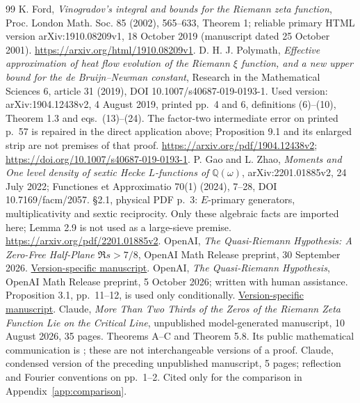 \documentclass[11pt]{article}
\theoremstyle{remark}\newtheorem{remark}[theorem]{Remark}
\begin{document}
\begin{thebibliography}{99}
 K. Ford, \emph{Vinogradov's integral and bounds for
the Riemann zeta function}, Proc. London Math. Soc. 85 (2002), 565--633,
Theorem 1; reliable primary HTML version arXiv:1910.08209v1,
18 October 2019 (manuscript dated 25 October 2001).
\url{https://arxiv.org/html/1910.08209v1}.
 D. H. J. Polymath,
\emph{Effective approximation of heat flow evolution of the Riemann
$\xi$ function, and a new upper bound for the de Bruijn--Newman constant},
Research in the Mathematical Sciences 6, article 31 (2019),
DOI 10.1007/s40687-019-0193-1.
Used version: arXiv:1904.12438v2, 4 August 2019, printed pp.~4 and 6,
definitions (6)--(10), Theorem 1.3 and eqs.~(13)--(24).
The factor-two intermediate error on printed p.~57 is repaired in
the direct application above; Proposition 9.1 and its enlarged strip
are not premises of that proof.
\url{https://arxiv.org/pdf/1904.12438v2};
\url{https://doi.org/10.1007/s40687-019-0193-1}.
 P. Gao and L. Zhao,
\emph{Moments and One level density of sextic Hecke $L$-functions
of $\mathbb Q(\omega)$}, arXiv:2201.01885v2, 24 July 2022;
Functiones et Approximatio 70(1) (2024), 7--28,
DOI 10.7169/facm/2057.
\S2.1, physical PDF p.~3: $E$-primary generators,
multiplicativity and sextic reciprocity.
Only these algebraic facts are imported here;
Lemma 2.9 is not used as a large-sieve premise.
\url{https://arxiv.org/pdf/2201.01885v2}.
 OpenAI,
\emph{The Quasi-Riemann Hypothesis: A Zero-Free Half-Plane
\(\Re s>7/8\)}, OpenAI Math Release preprint, 30 September 2026.
\href{https://github.com/openai/math/blob/fd4aeeb2ee4fc729c18d98444fed42fd0529eeeb/preprints/The-Quasi-Riemann-Hypothesis-September-30-2026/paper.pdf}{Version-specific manuscript}.
 OpenAI,
\emph{The Quasi-Riemann Hypothesis}, OpenAI Math Release preprint,
5 October 2026; written with human assistance.
Proposition 3.1, pp.~11--12, is used only conditionally.
\href{https://github.com/openai/math/blob/fd4aeeb2ee4fc729c18d98444fed42fd0529eeeb/preprints/The-Quasi-Riemann-Hypothesis-October-5-2026/paper2.pdf}{Version-specific manuscript}.
 Claude,
\emph{More Than Two Thirds of the Zeros of the Riemann Zeta Function
Lie on the Critical Line}, unpublished model-generated manuscript,
10 August 2026, 35 pages. Theorems A--C and Theorem 5.8.
Its public mathematical communication is \cite{AlpogeFurman};
these are not interchangeable versions of a proof.
 Claude,
condensed version of the preceding unpublished manuscript,
5 pages; reflection and Fourier conventions on pp.~1--2.
Cited only for the comparison in Appendix~\ref{app:comparison}.


\end{thebibliography}
\end{document}
